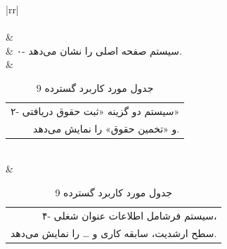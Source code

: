 \documentclass[12pt]{article}
\begin{document}
	\begin{center}
		\begin{table}[H]
			\caption{جدول مورد کاربرد گسترده 9}
			\label{tab:ext-uc9}
			\begin{tabular}{|rr|}
				\hline
				\rowcolor{Gainsboro!60}
				                                                                                                                                                                           \\ \hline
				                                                                                                                                                                                                                                          \\ \hline
				                                                                                            &                                                                                \\ \hline
				                                                                                                                    & ۰-  سیستم صفحه اصلی را نشان می‌دهد.                                                                                           \\ \hline
				      & \begin{tabular}[c]{@{}r@{}}۲- سیستم دو گزینه «ثبت حقوق دریافتی» \\ و «تخمین حقوق» را نمایش می‌دهد.\end{tabular}               \\ \hline
				                          & \begin{tabular}[c]{@{}r@{}}۴- سیستم فرشامل اطلاعات عنوان شغلی، \\ سطح ارشدیت، سابقه کاری و … را نمایش می‌دهد.\end{tabular} \\ \hline

\end{tabular}
\end{table}
\end{center}
\end{document}
